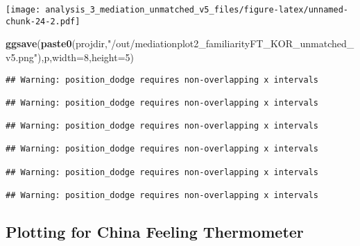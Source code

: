 \documentclass[
]{article}
\newenvironment{Shaded}{\begin{snugshade}}{\end{snugshade}}
\newcommand{\DataTypeTok}[1]{\textcolor[rgb]{0.13,0.29,0.53}{#1}}
\newcommand{\DecValTok}[1]{\textcolor[rgb]{0.00,0.00,0.81}{#1}}
\newcommand{\KeywordTok}[1]{\textcolor[rgb]{0.13,0.29,0.53}{\textbf{#1}}}
\newcommand{\NormalTok}[1]{#1}
\newcommand{\StringTok}[1]{\textcolor[rgb]{0.31,0.60,0.02}{#1}}
\begin{document}
\texttt{[image: analysis\_3\_mediation\_unmatched\_v5\_files/figure-latex/unnamed-chunk-24-2.pdf]}

\begin{Shaded}
\begin{Highlighting}[]
\KeywordTok{ggsave}\NormalTok{(}\KeywordTok{paste0}\NormalTok{(projdir,}\StringTok{"/out/mediationplot2_familiarityFT_KOR_unmatched_v5.png"}\NormalTok{),p,}\DataTypeTok{width=}\DecValTok{8}\NormalTok{,}\DataTypeTok{height=}\DecValTok{5}\NormalTok{)}
\end{Highlighting}
\end{Shaded}

\begin{verbatim}
## Warning: position_dodge requires non-overlapping x intervals

## Warning: position_dodge requires non-overlapping x intervals

## Warning: position_dodge requires non-overlapping x intervals

## Warning: position_dodge requires non-overlapping x intervals

## Warning: position_dodge requires non-overlapping x intervals

## Warning: position_dodge requires non-overlapping x intervals
\end{verbatim}

\hypertarget{plotting-for-china-feeling-thermometer}{%
\subsection{Plotting for China Feeling
Thermometer}\label{plotting-for-china-feeling-thermometer}}
\end{document}
